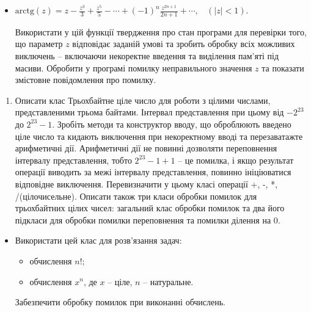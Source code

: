 \documentclass[]{article}
\begin{document}
\begin{itemize}
\item
  \(\text{arctg}\left( z \right) = z - \frac{z^{3}}{3} + \frac{z^{5}}{5} - \cdots + {( - 1)}^{n}\frac{z^{2n + 1}}{2n + 1} + \cdots,\ \ \ \ (\left| z \right| < 1)\).

  Використати у цій функції твердження про стан програми для перевірки
  того, що параметр \(z\) відповідає заданій умові та зробить обробку
  всіх можливих виключень -- включаючи некоректне введення та виділення
  пам'яті під масиви. Обробити у програмі помилку неправильного значення
  \(z\) та показати змістовне повідомлення про помилку.
\end{itemize}

\begin{enumerate}
\def\labelenumi{\arabic{enumi}.}
\item
  Описати клас Трьохбайтне ціле число для роботи з цілими числами,
  представленими трьома байтами. Інтервал представлення при цьому від
  \(- 2^{23}\) до \(2^{23} - 1\). Зробіть методи та конструктор вводу,
  що оброблюють введено ціле число та кидають виключення при
  некоректному вводі та перезаватажте арифметичні дії. Арифметичні дії
  не повинні дозволяти переповнення інтервалу представлення, тобто
  \(2^{23} - 1 + 1\) -- це помилка, і якщо результат операції виводить
  за межі інтервалу представлення, повинно ініціюватися відповідне
  виключення. Перевизначити у цьому класі операції +, -, *,
  /(цілочисельне). Описати також три класи обробки помилок для
  трьохбайтних цілих чисел: загальний клас обробки помилок та два його
  підкласи для обробки помилки переповнення та помилки ділення на 0.
\end{enumerate}

\begin{itemize}
\item
  Використати цей клас для розв'язання задач:

  \begin{itemize}
  \item
    обчислення \(n!\);
  \item
    обчислення \(x^{n}\), де \(x\) -- ціле, \(n\) -- натуральне.
  \end{itemize}

  Забезпечити обробку помилок при виконанні обчислень.
\end{itemize}
\end{document}
